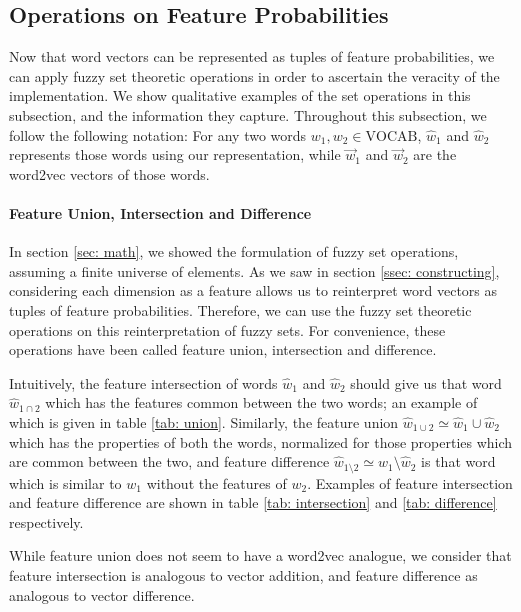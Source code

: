 \documentclass[11pt]{book}
\begin{document}
\subsection{Operations on Feature Probabilities} \label{ssec: set operations}

Now that word vectors can be represented as tuples of feature probabilities, we
can apply fuzzy set theoretic operations in order to ascertain the veracity of
the implementation. We show qualitative examples of the set operations in this
subsection, and the information they capture. Throughout this subsection, we
follow the following notation: For any two words $w_1, w_2 \in \text{VOCAB}$,
$\hat w_1$ and $\hat w_2$ represents those words using our representation,
while $\vec w_1$ and $\vec w_2$ are the word2vec vectors of those words.

\paragraph{Feature Union, Intersection and Difference} In section \ref{sec:
math}, we showed the formulation of fuzzy set operations, assuming a finite
universe of elements. As we saw in section \ref{ssec: constructing},
considering each dimension as a feature allows us to reinterpret word vectors
as tuples of feature probabilities. Therefore, we can use the fuzzy set
theoretic operations on this reinterpretation of fuzzy sets. For convenience,
these operations have been called feature union, intersection and difference. 

Intuitively, the feature intersection of words $\hat w_1$ and $\hat w_2$ should
give us that word $\hat w_{1 \cap 2}$ which has the features common between the
two words; an example of which is given in table \ref{tab: union}. Similarly,
the feature union $\hat w_{1 \cup 2} \simeq \hat w_1 \cup \hat w_2$ which has
the properties of both the words, normalized for those properties which are
common between the two, and feature difference $\hat w_{1 \setminus 2} \simeq
\hat w_1 \setminus \hat w_2$ is that word which is similar to $w_1$ without the
features of $w_2$. Examples of feature intersection and feature difference are
shown in table \ref{tab: intersection} and \ref{tab: difference} respectively.

While feature union does not seem to have a word2vec analogue, we consider that
feature intersection is analogous to vector addition, and feature difference as
analogous to vector difference.
\end{document}
